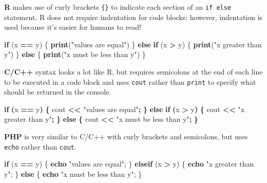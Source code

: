 \documentclass[
]{book}
\newenvironment{Shaded}{\begin{snugshade}}{\end{snugshade}}
\newcommand{\ControlFlowTok}[1]{\textcolor[rgb]{0.13,0.29,0.53}{\textbf{#1}}}
\newcommand{\FunctionTok}[1]{\textcolor[rgb]{0.13,0.29,0.53}{\textbf{#1}}}
\newcommand{\KeywordTok}[1]{\textcolor[rgb]{0.13,0.29,0.53}{\textbf{#1}}}
\newcommand{\NormalTok}[1]{#1}
\newcommand{\OperatorTok}[1]{\textcolor[rgb]{0.81,0.36,0.00}{\textbf{#1}}}
\newcommand{\OtherTok}[1]{\textcolor[rgb]{0.56,0.35,0.01}{#1}}
\newcommand{\SpecialCharTok}[1]{\textcolor[rgb]{0.81,0.36,0.00}{\textbf{#1}}}
\newcommand{\StringTok}[1]{\textcolor[rgb]{0.31,0.60,0.02}{#1}}
\begin{document}
\textbf{R} makes use of curly brackets \texttt{\{\}} to indicate each section of an \texttt{if\ else} statement. R does not require indentation for code blocks; however, indentation is used because it's easier for humans to read!

\begin{Shaded}
\begin{Highlighting}[]
\ControlFlowTok{if}\NormalTok{ (x }\SpecialCharTok{==}\NormalTok{ y) \{}
  \FunctionTok{print}\NormalTok{(}\StringTok{"values are equal"}\NormalTok{)}
\NormalTok{\} }\ControlFlowTok{else} \ControlFlowTok{if}\NormalTok{ (x }\SpecialCharTok{\textgreater{}}\NormalTok{ y) \{}
  \FunctionTok{print}\NormalTok{(}\StringTok{"x greater than y"}\NormalTok{)}
\NormalTok{\} }\ControlFlowTok{else}\NormalTok{ \{}
  \FunctionTok{print}\NormalTok{(}\StringTok{"x must be less than y"}\NormalTok{)}
\NormalTok{\}}
\end{Highlighting}
\end{Shaded}

\textbf{C/C++} syntax looks a lot like R, but requires semicolons at the end of each line to be executed in a code block and uses \texttt{cout} rather than \texttt{print} to specify what should be returned in the console.

\begin{Shaded}
\begin{Highlighting}[]
\ControlFlowTok{if} \OperatorTok{(}\NormalTok{x }\OperatorTok{==}\NormalTok{ y}\OperatorTok{)} \OperatorTok{\{}
\NormalTok{  cout }\OperatorTok{\textless{}\textless{}} \StringTok{"values are equal"}\OperatorTok{;}
\OperatorTok{\}} \ControlFlowTok{else} \ControlFlowTok{if} \OperatorTok{(}\NormalTok{x }\OperatorTok{\textgreater{}}\NormalTok{ y}\OperatorTok{)} \OperatorTok{\{}
\NormalTok{  cout }\OperatorTok{\textless{}\textless{}} \StringTok{"x greater than y"}\OperatorTok{;}
\OperatorTok{\}} \ControlFlowTok{else} \OperatorTok{\{}
\NormalTok{  cout }\OperatorTok{\textless{}\textless{}} \StringTok{"x must be less than y"}\OperatorTok{;}
\OperatorTok{\}}
\end{Highlighting}
\end{Shaded}

\textbf{PHP} is very similar to C/C++ with curly brackets and semicolons, but uses \texttt{echo} rather than \texttt{cout}.

\begin{Shaded}
\begin{Highlighting}[]
\ControlFlowTok{if}\NormalTok{ (x }\OperatorTok{==}\NormalTok{ y) \{}
  \KeywordTok{echo} \StringTok{"values are equal"}\OtherTok{;}
\NormalTok{\} }\ControlFlowTok{elseif}\NormalTok{ (x }\OperatorTok{\textgreater{}}\NormalTok{ y) \{}
  \KeywordTok{echo} \StringTok{"x greater than y"}\OtherTok{;}
\NormalTok{\} }\ControlFlowTok{else}\NormalTok{ \{}
  \KeywordTok{echo} \StringTok{"x must be less than y"}\OtherTok{;}
\NormalTok{\}}
\end{Highlighting}
\end{Shaded}
\end{document}
